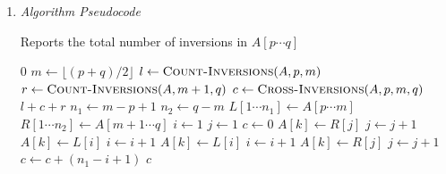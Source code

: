 \documentclass[10pt, letterpaper]{article}
\begin{document}
\begin{enumerate}[label={\bfseries Q\arabic*.}]
\begin{enumerate}
\begin{enumerate}[label={\arabic*.}, leftmargin=*]
          \item
            {\itshape Algorithm Pseudocode}
            \vspace{-3mm}
            \begin{center}
              \begin{minipage}{\linewidth}
                \begin{algorithm}[H]
                  \caption{Reports the total number of inversions in $A[p \cdots q]$}\label{alg:count-inversions}
                  \begin{algorithmic}[1]
                        \State \Return $0$
                      \EndIf
                      \State $m \gets \lfloor(p + q) / 2\rfloor$
                      \State $l \gets \textsc{Count-Inversions}(A,p,m)$ 
                      \State $r \gets \textsc{Count-Inversions}(A,m+1,q)$ 
                      \State $c \gets \textsc{Cross-Inversions}(A,p,m,q)$ 
                      \State \Return $l + c + r$
                    \EndProcedure
                    \State
                     
                      \State $n_1 \gets m - p + 1$
                      \State $n_2 \gets q - m$
                      \State $L[1 \cdots n_1] \gets A[p \cdots m]$
                      \State $R[1 \cdots n_2] \gets A[m + 1 \cdots q]$
                      \State $i \gets 1$
                      \State $j \gets 1$
                      \State $c \gets 0$ 
                         
                          \State $A[k] \gets R[j]$
                          \State $j \gets j + 1$
                         
                          \State $A[k] \gets L[i]$
                          \State $i \gets i + 1$
                         
                          \State $A[k] \gets L[i]$
                          \State $i \gets i + 1$
                        \Else {}
                          \State $A[k] \gets R[j]$
                          \State $j \gets j + 1$
                          \State $c \gets c + (n_1 - i + 1)$ 
                        \EndIf
                      \EndFor
                      \State \Return $c$
                    \EndProcedure
                  \end{algorithmic}
                \end{algorithm}
              \end{minipage}
            \end{center}


\end{enumerate}
\end{enumerate}
\end{enumerate}
\end{document}
